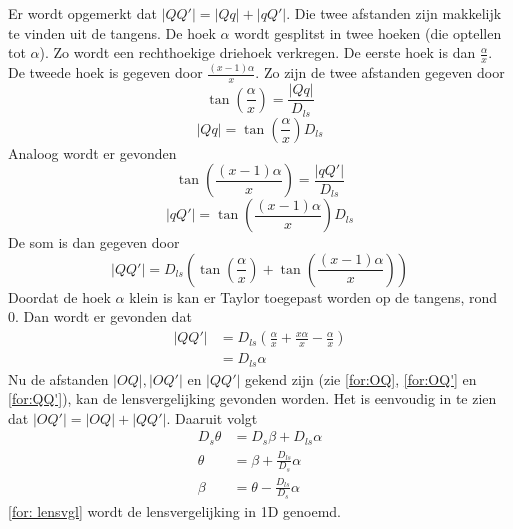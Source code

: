 Er wordt opgemerkt dat $|QQ'| = |Qq|+|qQ'|$. Die twee afstanden zijn makkelijk te vinden uit de tangens. De hoek $\alpha$ wordt gesplitst in twee hoeken (die optellen tot $\alpha$). Zo wordt een rechthoekige driehoek verkregen. De eerste hoek is dan $\frac{\alpha}{x}$. De tweede hoek is gegeven door $\frac{(x-1)\alpha}{x}$. Zo zijn de twee afstanden gegeven door
$$\tan\left(\frac{\alpha}{x}\right)=\frac{|Qq|}{D_{ls}}$$
$$|Qq|=\tan\left(\frac{\alpha}{x}\right)D_{ls}$$
Analoog wordt er gevonden
$$\tan\left(\frac{(x-1)\alpha}{x}\right)=\frac{|qQ'|}{D_{ls}}$$
$$|qQ'|=\tan\left(\frac{(x-1)\alpha}{x}\right)D_{ls}$$
De som is dan gegeven door
$$|QQ'|=D_{ls}\left(\tan\left(\frac{\alpha}{x}\right)+\tan\left(\frac{(x-1)\alpha}{x}\right)\right)$$
Doordat de hoek $\alpha$ klein is kan er Taylor toegepast worden op de tangens, rond 0. Dan wordt er gevonden dat
\begin{align}
    |QQ'| &=D_{ls}\left(\frac{\alpha}{x}+\frac{x\alpha}{x}-\frac{\alpha}{x}\right) \nonumber\\
    &=D_{ls}\alpha
    \label{for:QQ'}
\end{align}
Nu de afstanden $|OQ|, |OQ'|$ en $|QQ'|$ gekend zijn (zie \cref{for:OQ}, \cref{for:OQ'} en \cref{for:QQ'}), kan de lensvergelijking gevonden worden. Het is eenvoudig in te zien dat $|OQ'|=|OQ|+|QQ'|$. Daaruit volgt
\begin{align}
    D_{s}\theta &=D_{s}\beta + D_{ls}\alpha \nonumber\\
    \theta &= \beta + \frac{D_{ls}}{D_{s}}\alpha \nonumber\\
    \beta &= \theta - \frac{D_{ls}}{D_{s}}\alpha
    \label{for: lensvgl}
\end{align}
\cref{for: lensvgl} wordt de lensvergelijking in 1D genoemd.
\onecolumn
\mbox{}
